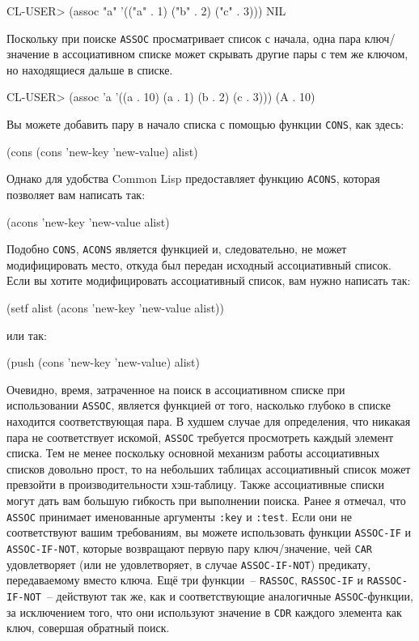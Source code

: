 \begin{myverb}
  CL-USER> (assoc "a" '(("a" . 1) ("b" . 2) ("c" . 3)))
  NIL
\end{myverb}

Поскольку при поиске \lstinline{ASSOC} просматривает список с начала, одна пара ключ/значение в
ассоциативном списке может скрывать другие пары с тем же ключом, но находящиеся дальше в
списке.

\begin{myverb}
  CL-USER> (assoc 'a '((a . 10) (a . 1) (b . 2) (c . 3)))
  (A . 10)
\end{myverb}

Вы можете добавить пару в начало списка с помощью функции \lstinline{CONS}, как здесь:

\begin{myverb}
  (cons (cons 'new-key 'new-value) alist)
\end{myverb}

Однако для удобства Common Lisp предоставляет функцию \lstinline{ACONS}, которая позволяет вам
написать так:

\begin{myverb}
  (acons 'new-key 'new-value alist)
\end{myverb}

Подобно \lstinline{CONS}, \lstinline{ACONS} является функцией и, следовательно, не может
модифицировать место, откуда был передан исходный ассоциативный список. Если вы хотите
модифицировать ассоциативный список, вам нужно написать так:

\begin{myverb}
  (setf alist (acons 'new-key 'new-value alist))
\end{myverb}

\noindent{}или так:

\begin{myverb}
  (push (cons 'new-key 'new-value) alist)
\end{myverb}

Очевидно, время, затраченное на поиск в ассоциативном списке при использовании
\lstinline{ASSOC}, является функцией от того, насколько глубоко в списке находится
соответствующая пара. В худшем случае для определения, что никакая пара не соответствует
искомой, \lstinline{ASSOC} требуется просмотреть каждый элемент списка. Тем не менее поскольку
основной механизм работы ассоциативных списков довольно прост, то на небольших таблицах
ассоциативный список может превзойти в производительности хэш-таблицу.  Также
ассоциативные списки могут дать вам большую гибкость при выполнении поиска. Ранее я
отмечал, что \lstinline{ASSOC} принимает именованные аргументы \lstinline{:key} и \lstinline{:test}. Если
они не соответствуют вашим требованиям, вы можете использовать функции \lstinline{ASSOC-IF} и
\lstinline{ASSOC-IF-NOT}, которые возвращают первую пару ключ/значение, чей \lstinline{CAR}
удовлетворяет (или не удовлетворяет, в случае \lstinline{ASSOC-IF-NOT}) предикату,
передаваемому вместо ключа. Ещё три функции~-- \lstinline{RASSOC}, \lstinline{RASSOC-IF} и
\lstinline{RASSOC-IF-NOT}~-- действуют так же, как и соответствующие аналогичные
\lstinline{ASSOC}-функции, за исключением того, что они используют значение в \lstinline{CDR}
каждого элемента как ключ, совершая обратный поиск.

